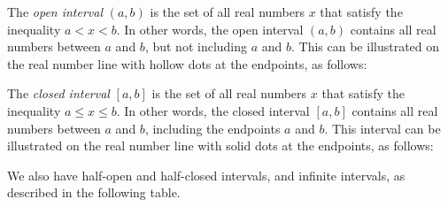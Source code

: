 \documentclass[letterpaper,12pt,oneside]{book}
\theoremstyle{definition}
\begin{document}
{\noindent
The \emph{open interval} $(a,b)$ is the set of all real numbers $x$ that satisfy the inequality $a<x<b$.
In other words, the open interval $(a,b)$ contains all real numbers between $a$ and $b$, but not including $a$ and $b$.  This can be illustrated on the real number line with hollow dots at the endpoints, as follows:

\begin{center}
\end{center}

\noindent
The \emph{closed interval} $[a,b]$ is the set of all real numbers $x$ that satisfy the inequality  $a\leq x\leq b$.
In other words, the closed interval $[a,b]$ contains all real numbers between $a$ and $b$, including the endpoints $a$ and $b$.  This interval can be illustrated on the real number line with solid dots at the endpoints, as follows:

\begin{center}
\end{center}

\newpage

\noindent
We also have half-open and half-closed intervals, and infinite intervals, as described in the following table.

}
\end{document}
